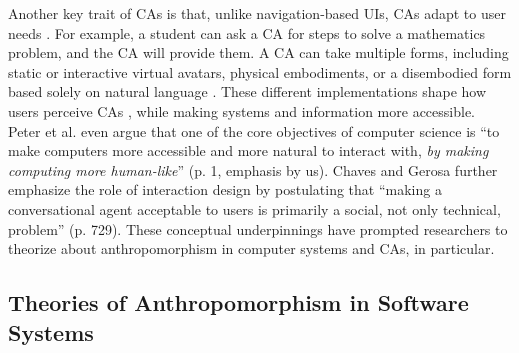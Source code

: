 \documentclass[lettersize,journal]{IEEEtran}
\begin{document}
Another key trait of CAs is that, unlike navigation-based UIs, CAs adapt to user needs \cite{folstad2017chatbots,jain2018evaluating}. For example, a student can ask a CA for steps to solve a mathematics problem, and the CA will provide them. A CA can take multiple forms, including static or interactive virtual avatars, physical embodiments, or a disembodied form based solely on natural language \cite{diederich_conversational_2019,diederich_design_2022}. These different implementations shape how users perceive CAs \cite{peter_benefits_2025}, while making systems and information more accessible. Peter et al. \cite{peter_benefits_2025} even argue that one of the core objectives of computer science is ``to make computers more accessible and more natural to interact with, \textit{by making computing more human-like}'' (p. 1, emphasis by us). Chaves and Gerosa \cite{chaves2021should} further emphasize the role of interaction design by postulating that ``making a conversational agent acceptable to users is primarily a social, not only technical, problem'' (p. 729). These conceptual underpinnings have prompted researchers to theorize about anthropomorphism in computer systems and CAs, in particular.


\subsection{Theories of Anthropomorphism in Software Systems}

\end{document}
